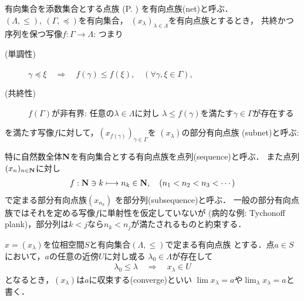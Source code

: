 	\begin{screen}
		\begin{dfn}[有向点族]
			有向集合を添数集合とする点族
			(P. \pageref{dfn:family_collection})
			を有向点族(net)と呼ぶ．
			$(\Lambda,\leq),\ (\Gamma,\preceq)$を有向集合，
			$(x_\lambda)_{\lambda \in \Lambda}$を有向点族とするとき，
			共終かつ序列を保つ写像$f:\Gamma \longrightarrow \Lambda$:
			つまり
			\begin{description}
				\item[(単調性)] $\gamma \preceq \xi \quad \Longrightarrow \quad
					f(\gamma) \leq f(\xi),\quad (\forall \gamma,\xi \in \Gamma)$,
				\item[(共終性)] $f(\Gamma)$が非有界:
					任意の$\lambda \in \Lambda$に対し
					$\lambda \leq f(\gamma)$を満たす$\gamma \in \Gamma$が存在する
			\end{description}
			を満たす写像$f$に対して，$\left(x_{f(\gamma)}\right)_{\gamma \in \Gamma}$を
			$(x_\lambda)$の部分有向点族
			(subnet)と呼ぶ:
		\end{dfn}
	\end{screen}
	特に自然数全体$\mathbf{N}$を有向集合とする有向点族を点列(sequence)と呼ぶ．
	また点列$(x_n)_{n \in \mathbf{N}}$に対し
	\begin{align}
		f:\mathbf{N} \ni k \longmapsto n_k \in \mathbf{N},
		\quad (n_1 < n_2 < n_3 < \cdots)
	\end{align}
	で定まる部分有向点族$\left(x_{n_k}\right)$
	を部分列(subsequence)と呼ぶ．
	一般の部分有向点族ではそれを定める写像$f$に単射性を仮定していないが
	(病的な例: Tychonoff plank)，部分列は$k < j$なら$n_k < n_j$が満たされるものと約束する．
	
	
	\begin{screen}
		\begin{dfn}
			$x = (x_\lambda)$を位相空間$S$と有向集合$(\Lambda,\leq)$で定まる有向点族
			とする．点$a \in S$において，$a$の任意の近傍$U$に対し或る
			$\lambda_0 \in \Lambda$が存在して
			\begin{align}
				\lambda_0 \leq \lambda \quad \Longrightarrow \quad
				x_\lambda \in U
			\end{align}
			となるとき，$(x_\lambda)$は$a$に収束する(converge)といい
			$\lim x_\lambda = a$や$\lim_{\lambda} x_\lambda = a$と書く．
		\end{dfn}
	\end{screen}
	
